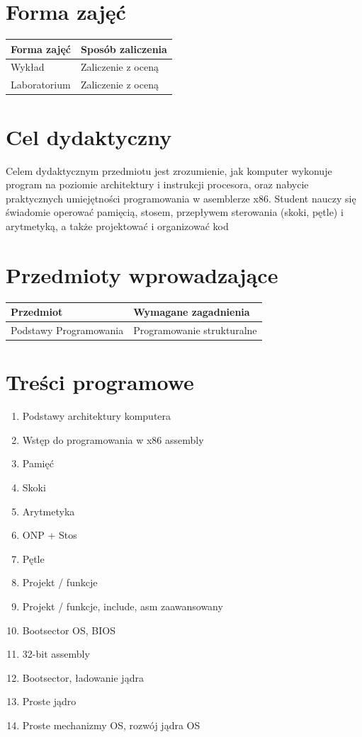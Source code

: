 \documentclass[12pt, a4paper]{article}
\begin{document}
\section{Forma zajęć}

\begin{tabular}{ll}
  \hline
  \textbf{Forma zajęć} & \textbf{Sposób zaliczenia} \\
  \hline
  Wykład & Zaliczenie z oceną \\
  Laboratorium & Zaliczenie z oceną \\
  \hline
\end{tabular}

\section{Cel dydaktyczny}

Celem dydaktycznym przedmiotu jest zrozumienie, jak komputer wykonuje program na poziomie architektury i instrukcji procesora, oraz nabycie praktycznych umiejętności programowania w asemblerze x86. Student nauczy się świadomie operować pamięcią, stosem, przepływem sterowania (skoki, pętle) i arytmetyką, a także projektować i organizować kod

\section{Przedmioty wprowadzające}

\begin{tabularx}{\textwidth}{lX}
  \hline
  \textbf{Przedmiot} & \textbf{Wymagane zagadnienia} \\
  \hline
  Podstawy Programowania & Programowanie strukturalne \\
  \hline
\end{tabularx}

\section{Treści programowe}

\begin{enumerate}
  \item Podstawy architektury komputera
  \item Wstęp do programowania w x86 assembly
  \item Pamięć
  \item Skoki
  \item Arytmetyka
  \item ONP + Stos
  \item Pętle
  \item Projekt / funkcje
  \item Projekt / funkcje, include, asm zaawansowany
  \item Bootsector OS, BIOS
  \item 32-bit assembly
  \item Bootsector, ładowanie jądra
  \item Proste jądro
  \item Proste mechanizmy OS, rozwój jądra OS
\end{enumerate}
\end{document}
